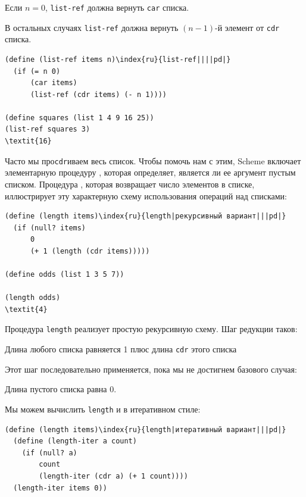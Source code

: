 \begin{plainlist}
\item
  Если $n = 0$, {\tt list-ref} должна 
  вернуть {\tt car} списка.

\item
  В остальных случаях {\tt list-ref} должна
  вернуть $(n - 1)$-й элемент от {\tt cdr} списка.
\end{plainlist}

\begin{Verbatim}[fontsize=\small]
(define (list-ref items n)\index{ru}{list-ref||||pd|}
  (if (= n 0)
      (car items)
      (list-ref (cdr items) (- n 1))))

(define squares (list 1 4 9 16 25))
(list-ref squares 3)
\textit{16}
\end{Verbatim}
Часто мы про{\tt cdr}иваем весь список.  Чтобы помочь нам с
этим, Scheme включает элементарную процедуру 
,
которая определяет, является ли ее аргумент пустым списком.  
Процедура  ,
которая возвращает число элементов в списке,
иллюстрирует эту характерную схему использования операций над списками:

\begin{Verbatim}[fontsize=\small]
(define (length items)\index{ru}{length|рекурсивный вариант|||pd|}
  (if (null? items)
      0
      (+ 1 (length (cdr items)))))

(define odds (list 1 3 5 7))

(length odds)
\textit{4}
\end{Verbatim}
Процедура {\tt length} реализует простую рекурсивную схему. Шаг
редукции таков:

\begin{plainlist}

\item
Длина любого списка равняется 1 плюс длина
{\tt cdr} этого списка
\end{plainlist}
Этот шаг последовательно применяется, пока мы не достигнем базового
случая:

\begin{plainlist}
\item
Длина пустого списка равна 0.
\end{plainlist}
Мы можем вычислить {\tt length} и в итеративном стиле:

\begin{Verbatim}[fontsize=\small]
(define (length items)\index{ru}{length|итеративный вариант|||pd|}
  (define (length-iter a count)
    (if (null? a)
        count
        (length-iter (cdr a) (+ 1 count))))
  (length-iter items 0))
\end{Verbatim}


